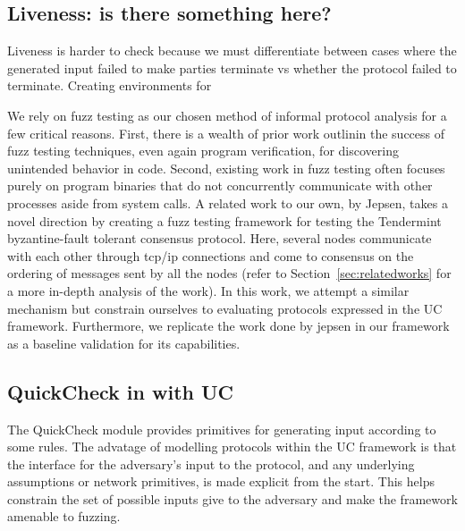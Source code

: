\subsection{Liveness: is there something here?}
Liveness is harder to check because we must differentiate between cases where
the generated input failed to make parties terminate vs whether the protocol failed to terminate.
Creating environments for  

We rely on fuzz testing as our chosen method of informal protocol analysis for a few critical reasons. 
First, there is a wealth of prior work outlinin the success of fuzz testing techniques, even again program verification, for discovering unintended behavior in code.
Second, existing work in fuzz testing often focuses purely on program binaries that do not concurrently communicate with other processes aside from system calls.
A related work to our own, by Jepsen, takes a novel direction by creating a fuzz testing framework for testing the Tendermint byzantine-fault tolerant consensus protocol. 
Here, several nodes communicate with each other through tcp/ip connections and come to consensus on the ordering of messages sent by all the nodes (refer to Section~\ref{sec:relatedworks} for a more in-depth analysis of the work). 
In this work, we attempt a similar mechanism but constrain ourselves to evaluating protocols expressed in the UC framework.
Furthermore, we replicate the work done by jepsen in our framework as a baseline validation for its capabilities. 

\subsection{QuickCheck in with UC}
The QuickCheck module provides primitives for generating input according to some rules. 
The advatage of modelling protocols within the UC framework is that the interface for the adversary's input to the protocol, and any underlying assumptions or network primitives, is made explicit from the start.
This helps constrain the set of possible inputs give to the adversary and make the framework amenable to fuzzing.

